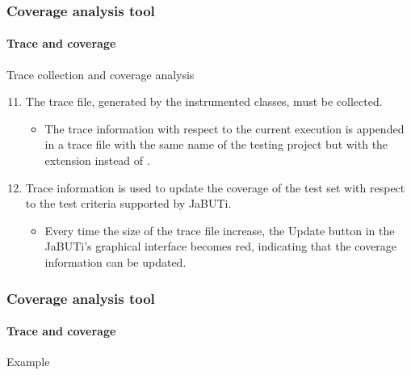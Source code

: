 \begin{frame}
\frametitle{Coverage analysis tool}
\framesubtitle{Trace and coverage}

\begin{block:procedure}{Trace collection and coverage analysis}
\begin{enumerate}
	\setcounter{enumi}{10}
	\item The trace file, generated by the instrumented classes, must be
	collected.
	\begin{itemize}
		\item The trace information with respect to the current execution is
		appended in a trace file with the same name of the testing project but
		with the extension  instead of .
	\end{itemize}

	\item Trace information is used to update the coverage of the test set
	with respect to the test criteria supported by JaBUTi.
	\begin{itemize}
		\item Every time the size of the trace file increase, the Update button
		in the JaBUTi's graphical interface becomes red, indicating that the
		coverage information can be updated.
	\end{itemize}
\end{enumerate}
\end{block:procedure}
\end{frame}



\begin{frame}[imacidie]
\frametitle{Coverage analysis tool}
\framesubtitle{Trace and coverage}

\begin{block}{Example}
\end{block}
\end{frame}
